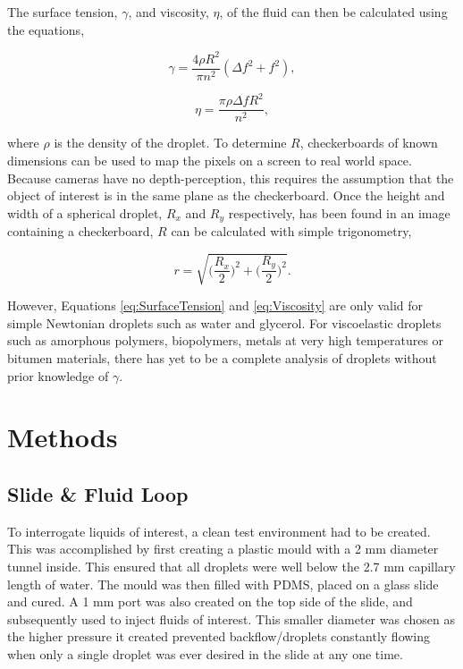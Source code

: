 \documentclass{physics_article_B}
\begin{document}
    The surface tension, $\gamma$, and viscosity, $\eta$, of the fluid can then be calculated using the equations,
 
        \begin{equation} 
        \label{eq:SurfaceTension}
            \gamma = \frac{4\rho R^{2}}{\pi n^{2}}(\Delta f^{2} + f^{2}),
        \end{equation}
        
        \begin{equation} 
        \label{eq:Viscosity}
            \eta = \frac{\pi \rho \Delta f R^{2}}{n^{2}},
        \end{equation}

    where $\rho$ is the density of the droplet. To determine $R$, checkerboards of known dimensions can be used to map the pixels on a screen to real world space. Because cameras have no depth-perception, this requires the assumption that the object of interest is in the same plane as the checkerboard. Once the height and width of a spherical droplet, $R_x$ and $R_y$ respectively, has been found in an image containing a checkerboard, $R$ can be calculated with simple trigonometry,
            
        \begin{equation}\label{eq:radii}
            r = \sqrt{\Big(\frac{R_x}{2}\Big)^2 + \Big(\frac{R_y}{2}\Big)^2} .
        \end{equation}

    However, Equations \ref{eq:SurfaceTension} and \ref{eq:Viscosity} are only valid for simple Newtonian droplets such as water and glycerol. For viscoelastic droplets such as amorphous polymers, biopolymers, metals at very high temperatures or bitumen materials, there has yet to be a complete analysis of droplets without prior knowledge of $\gamma$.
\newpage
\section{Methods\label{sect:method}}

    \subsection{Slide \& Fluid Loop\label{sect:method:slide}}
    
        To interrogate liquids of interest, a clean test environment had to be created. This was accomplished by first creating a plastic mould with a 2 mm diameter tunnel inside. This ensured that all droplets were well below the 2.7 mm capillary length of water\cite{capillary}. The mould was then filled with PDMS, placed on a glass slide and cured. A 1 mm port was also created on the top side of the slide, and subsequently used to inject fluids of interest. This smaller diameter was chosen as the higher pressure it created prevented backflow/droplets constantly flowing when only a single droplet was ever desired in the slide at any one time.
        
\end{document}
